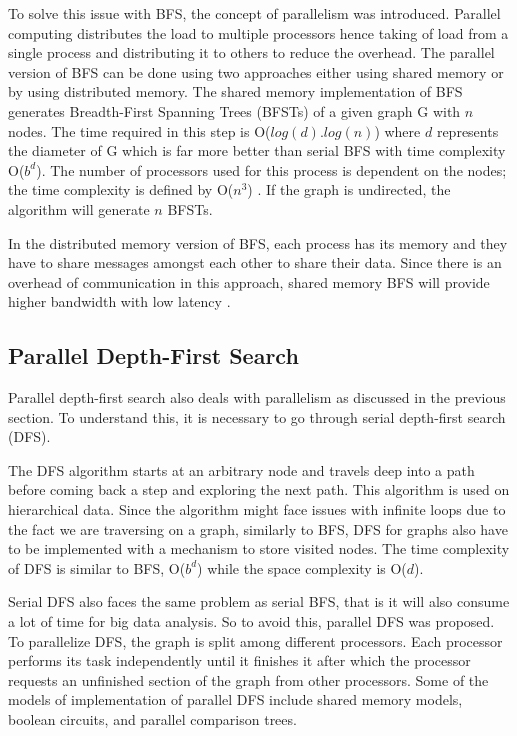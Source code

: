 \documentclass[journal,twoside,web]{ieeecolor}
\begin{document}
To solve this issue with BFS, the concept of parallelism was introduced. Parallel computing distributes the load to multiple processors hence taking of load from a single process and distributing it to others to reduce the overhead. The parallel version of BFS can be done using two approaches either using shared memory or by using distributed memory. The shared memory implementation of BFS generates Breadth-First Spanning Trees (BFSTs) of a given graph G with $n$ nodes. The time required in this step is O($log(d).log(n)$) where $d$ represents the diameter of G which is far more better than serial BFS with time complexity O($b^d$). The number of processors used for this process is dependent on the nodes; the time complexity is defined by O($n^3$) \cite{36}. If the graph is undirected, the algorithm will generate $n$ BFSTs.

In the distributed memory version of BFS, each process has its memory and they have to share messages amongst each other to share their data. Since there is an overhead of communication in this approach, shared memory BFS will provide higher bandwidth with low latency \cite{37}.

\subsection{Parallel Depth-First Search}
Parallel depth-first search also deals with parallelism as discussed in the previous section. To understand this, it is necessary to go through serial depth-first search (DFS).

The DFS algorithm starts at an arbitrary node and travels deep into a path before coming back a step and exploring the next path. This algorithm is used on hierarchical data. Since the algorithm might face issues with infinite loops due to the fact we are traversing on a graph, similarly to BFS, DFS for graphs also have to be implemented with a mechanism to store visited nodes. The time complexity of DFS is similar to BFS, O($b^d$) while the space complexity is O($d$).

Serial DFS also faces the same problem as serial BFS, that is it will also consume a lot of time for big data analysis. So to avoid this, parallel DFS was proposed. To parallelize DFS, the graph is split among different processors. Each processor performs its task independently until it finishes it after which the processor requests an unfinished section of the graph from other processors. Some of the models of implementation of parallel DFS include shared memory models, boolean circuits, and parallel comparison trees\cite{38}.  
\end{document}
